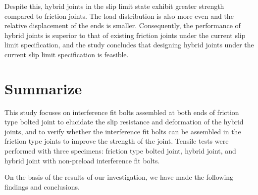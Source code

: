 Despite this, hybrid joints in the slip limit state exhibit greater strength compared to friction joints. The load distribution is also more even and the relative displacement of the ends is smaller. Consequently, the performance of hybrid joints is superior to that of existing friction joints under the current slip limit specification, and the study concludes that designing hybrid joints under the current slip limit specification is feasible.

\section{Summarize}

This study focuses on interference fit bolts assembled at both ends of friction type bolted joint to elucidate the slip resistance and deformation of the hybrid joints, and to verify whether the interference fit bolts can be assembled in the friction type joints to improve the strength of the joint. Tensile tests were performed with three specimens: friction type bolted joint, hybrid joint, and hybrid joint with non-preload interference fit bolts. 

On the basis of the results of our investigation, we have made the following findings and conclusions. \par

